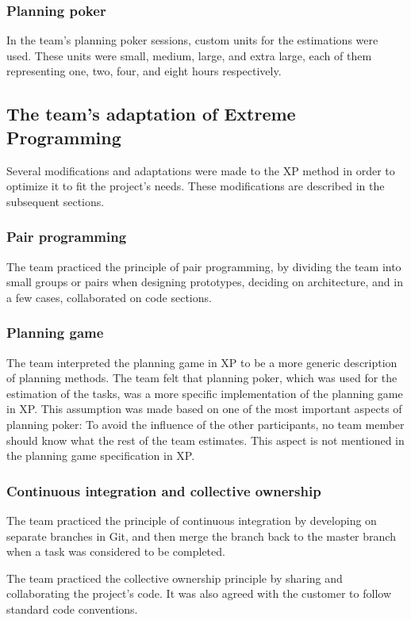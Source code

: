 \subsubsection{Planning poker}
In the team's planning poker sessions, custom units for the estimations were used. These units were small, medium, large, and extra large, each of them representing one, two, four, and eight hours respectively.

\newpage
\subsection{The team's adaptation of Extreme Programming}
\label{sec:adapExtremeProgr}
Several modifications and adaptations were made to the XP method in order to optimize it to fit the project's needs. These modifications are described in the subsequent sections.

\subsubsection{Pair programming}
The team practiced the principle of pair programming, by dividing the team into small groups or pairs when designing prototypes, deciding on architecture, and in a few cases, collaborated on code sections.

\subsubsection{Planning game}
The team interpreted the planning game in XP to be a more generic description of planning methods. The team felt that planning poker, which was used for the estimation of the tasks, was a more specific implementation of the planning game in XP. This assumption was made based on one of the most important aspects of planning poker: To avoid the influence of the other participants, no team member should know what the rest of the team estimates. This aspect is not mentioned in the planning game specification in XP.

\subsubsection{Continuous integration and collective ownership}
The team practiced the principle of continuous integration by developing on separate branches in Git, and then merge the branch back to the master branch when a task was considered to be completed.

The team practiced the collective ownership principle by sharing and collaborating the project's code. It was also agreed with the customer to follow standard code conventions.

